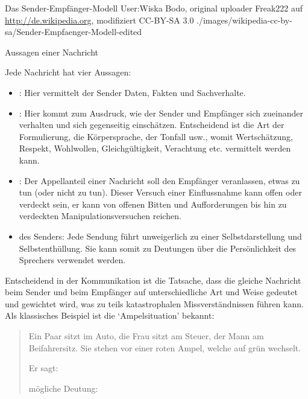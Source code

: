 \Picture
{Das Sender-Empfänger-Modell \cite{Informatik3}}%
{}%
{}%
{User:Wiska Bodo, original uploader Freak222
auf \url{http://de.wikipedia.org}, modifiziert}%
{CC-BY-SA 3.0}%
{./images/wikipedia-cc-by-sa/Sender-Empfaenger-Modell-edited}%
{}%
{}%


\Text
{Aussagen einer Nachricht}
{Jede Nachricht hat vier Aussagen:

\begin{itemize}
  \item {}: Hier vermittelt der
  Sender Daten, Fakten und Sachverhalte.
  \item {}: Hier
  kommt zum Ausdruck, wie der Sender und Empfänger sich
  zueinander verhalten und sich gegenseitig einschätzen.
  Entscheidend ist die Art der Formulierung, die
  Körpersprache, der Tonfall usw., womit Wertschätzung, Respekt,
  Wohlwollen, Gleichgültigkeit, Verachtung etc. vermittelt
  werden kann.
  \item {}: Der Appellanteil einer Nachricht
  soll den Empfänger veranlassen, etwas zu tun
  (oder nicht zu tun). 
  Dieser Versuch einer Einflussnahme kann offen oder
  verdeckt sein, er kann von offenen Bitten und
  Aufforderungen bis hin zu verdeckten
  Manipulationsversuchen reichen.
  \item {} des Senders: Jede Sendung
  führt unweigerlich zu einer Selbstdarstellung und Selbstenthüllung.
  Sie kann somit zu Deutungen über die
  Persönlichkeit des Sprechers verwendet werden. 
\end{itemize}

Entscheidend in der Kommunikation ist die Tatsache, dass die
gleiche Nachricht beim Sender und beim Empfänger auf
unterschiedliche Art und Weise gedeutet und gewichtet wird,
was zu teils katastrophalen Missverständnissen führen kann. Als
klassisches Beispiel ist die \enquote*{Ampelsituation}
bekannt: 

\begin{quote}
  Ein Paar sitzt im Auto, die Frau sitzt am Steuer, der Mann
  am Beifahrersitz. Sie stehen vor einer roten Ampel, welche
  auf grün wechselt.
  
  Er sagt: 
  
   mögliche Deutung:\small
  

\end{quote}}
